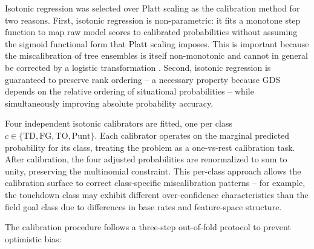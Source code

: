Isotonic regression was selected over Platt scaling as the calibration
method for two reasons. First, isotonic regression is non-parametric: it
fits a monotone step function to map raw model scores to calibrated
probabilities without assuming the sigmoid functional form that Platt
scaling imposes. This is important because the miscalibration of tree
ensembles is itself non-monotonic and cannot in general be corrected by a
logistic transformation \parencite{niculescumizil2005probabilities}. Second,
isotonic regression is guaranteed to preserve rank ordering -- a necessary
property because GDS depends on the relative ordering of situational
probabilities -- while simultaneously improving absolute probability
accuracy.

Four independent isotonic calibrators are fitted, one per class $c \in
\{\text{TD}, \text{FG}, \text{TO}, \text{Punt}\}$. Each calibrator operates
on the marginal predicted probability for its class, treating the problem
as a one-vs-rest calibration task. After calibration, the four adjusted
probabilities are renormalized to sum to unity, preserving the multinomial
constraint. This per-class approach allows the calibration surface to
correct class-specific miscalibration patterns -- for example, the touchdown
class may exhibit different over-confidence characteristics than the field
goal class due to differences in base rates and feature-space structure.

The calibration procedure follows a three-step out-of-fold protocol to
prevent optimistic bias:


